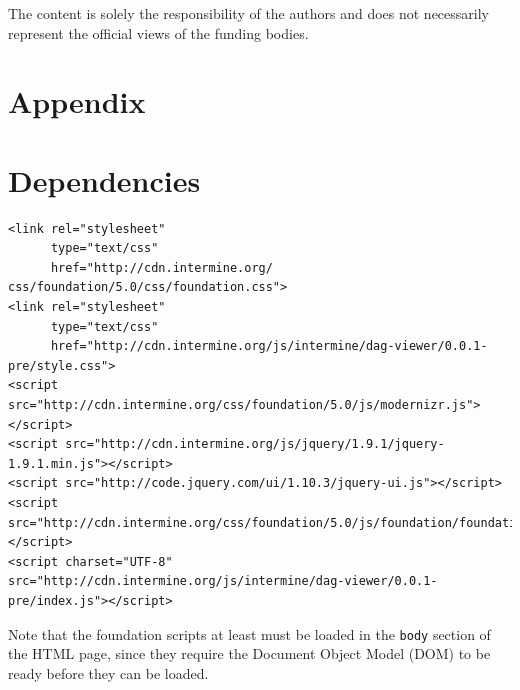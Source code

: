 \documentclass[10pt,a4paper,twocolumn]{article}
\begin{document}
The content is solely the responsibility of the authors and does not necessarily
represent the official views of the funding bodies.

\nocite{*}
{\small
}

\clearpage
\section*{Appendix}
\appendix

\section{Dependencies}
\label{sec:deps}

\lstset{language=HTML}
\begin{lstlisting}
<link rel="stylesheet"
      type="text/css"
      href="http://cdn.intermine.org/
css/foundation/5.0/css/foundation.css">
<link rel="stylesheet"
      type="text/css"
      href="http://cdn.intermine.org/js/intermine/dag-viewer/0.0.1-pre/style.css">
<script src="http://cdn.intermine.org/css/foundation/5.0/js/modernizr.js"></script>
<script src="http://cdn.intermine.org/js/jquery/1.9.1/jquery-1.9.1.min.js"></script>
<script src="http://code.jquery.com/ui/1.10.3/jquery-ui.js"></script>
<script src="http://cdn.intermine.org/css/foundation/5.0/js/foundation/foundation.js"></script>
<script charset="UTF-8" src="http://cdn.intermine.org/js/intermine/dag-viewer/0.0.1-pre/index.js"></script>
\end{lstlisting}

Note that the foundation scripts at least must be loaded in the
\texttt{body} section of the HTML page, since they require the
Document Object Model (DOM) to be ready before they can be loaded.






\end{document}

